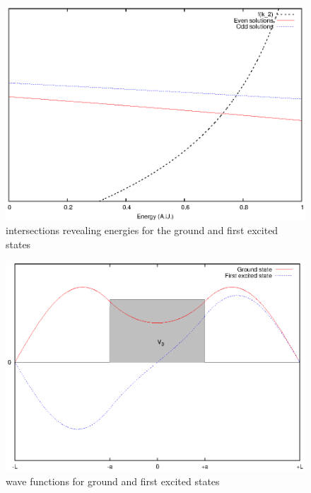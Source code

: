 \documentclass{article}
\begin{document}
\begin{figure}
\centering
\includegraphics{ex_1_3_ground_energies.eps}
\caption{intersections revealing energies for the ground and first excited states}
\label{ex_1_3_ground_energies}
\end{figure}

\begin{figure}
\centering
\includegraphics{ex_1_3_psi.eps}
\caption{wave functions for ground and first excited states}
\label{ex_1_3_psi}
\end{figure}
\end{document}
